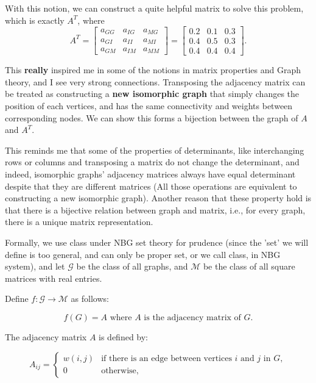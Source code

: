 \documentclass[12pt,a4paper]{article}
\begin{document}
\begin{solution}
\begin{remark}
With this notion, we can construct a quite helpful matrix to solve this problem, which is exactly $A^T$, where
\begin{equation}\label{W4adjT}
A^T = 
\begin{bmatrix}
a_{GG} & a_{IG} & a_{MG} \\
a_{GI} & a_{II} & a_{MI} \\
a_{GM} & a_{IM} & a_{MM}
\end{bmatrix}
=
\left[\begin{array}{lll}
0.2 & 0.1 & 0.3 \\
0.4 & 0.5 & 0.3 \\
0.4 & 0.4 & 0.4
\end{array}\right].
\end{equation}

This \textbf{really} inspired me in some of the notions in matrix properties and Graph theory, and I see very strong connections. Transposing the adjacency matrix can be treated as constructing a \textbf{new isomorphic graph} that simply changes the position of each vertices, and has the same connectivity and weights between corresponding nodes. We can show this forms a bijection between the graph of $A$ and $A^T$.

This reminds me that some of the properties of determinants, like interchanging rows or columns and transposing a matrix do not change the determinant, and indeed, isomorphic graphs' adjacency matrices always have equal determinant despite that they are different matrices (All those operations are equivalent to constructing a new isomorphic graph). Another reason that these property hold is that there is a bijective relation between graph and matrix, i.e., for every graph, there is a unique matrix representation. 

Formally, we use class under NBG set theory for prudence (since the 'set' we will define is too general, and can only be proper set, or we call class, in NBG system), and let \( \mathcal{G} \) be the class of all graphs, and \( \mathcal{M} \) be the class of all square matrices with real entries.

Define \( f: \mathcal{G} \rightarrow \mathcal{M} \) as follows:

\[
f(G) = A \text{ where } A \text{ is the adjacency matrix of } G.
\]

The adjacency matrix \( A \) is defined by:

\[
A_{ij} = \begin{cases}
    w(i,j) & \text{if there is an edge between vertices } i \text{ and } j \text{ in } G, \\
    0 & \text{otherwise},
\end{cases}
\]


\end{remark}
\end{solution}
\end{document}
